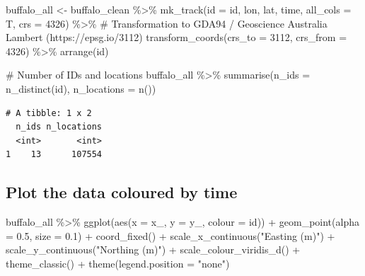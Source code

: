 \documentclass[
  letterpaper,
  DIV=11,
  numbers=noendperiod]{scrartcl}
\newenvironment{Shaded}{\begin{snugshade}}{\end{snugshade}}
\newcommand{\AttributeTok}[1]{\textcolor[rgb]{0.40,0.45,0.13}{#1}}
\newcommand{\CommentTok}[1]{\textcolor[rgb]{0.37,0.37,0.37}{#1}}
\newcommand{\DecValTok}[1]{\textcolor[rgb]{0.68,0.00,0.00}{#1}}
\newcommand{\FloatTok}[1]{\textcolor[rgb]{0.68,0.00,0.00}{#1}}
\newcommand{\FunctionTok}[1]{\textcolor[rgb]{0.28,0.35,0.67}{#1}}
\newcommand{\NormalTok}[1]{\textcolor[rgb]{0.00,0.23,0.31}{#1}}
\newcommand{\OtherTok}[1]{\textcolor[rgb]{0.00,0.23,0.31}{#1}}
\newcommand{\SpecialCharTok}[1]{\textcolor[rgb]{0.37,0.37,0.37}{#1}}
\newcommand{\StringTok}[1]{\textcolor[rgb]{0.13,0.47,0.30}{#1}}
\newcounter{none} %
\begin{document}
\begin{Shaded}
\begin{Highlighting}[]
\NormalTok{buffalo\_all }\OtherTok{\textless{}{-}}\NormalTok{ buffalo\_clean }\SpecialCharTok{\%\textgreater{}\%} \FunctionTok{mk\_track}\NormalTok{(}\AttributeTok{id =}\NormalTok{ id,}
\NormalTok{                                          lon,}
\NormalTok{                                          lat, }
\NormalTok{                                          time, }
                                          \AttributeTok{all\_cols =}\NormalTok{ T,}
                                          \AttributeTok{crs =} \DecValTok{4326}\NormalTok{) }\SpecialCharTok{\%\textgreater{}\%} 
  \CommentTok{\# Transformation to GDA94 / Geoscience Australia Lambert (https://epsg.io/3112)}
  \FunctionTok{transform\_coords}\NormalTok{(}\AttributeTok{crs\_to =} \DecValTok{3112}\NormalTok{, }\AttributeTok{crs\_from =} \DecValTok{4326}\NormalTok{) }\SpecialCharTok{\%\textgreater{}\%} \FunctionTok{arrange}\NormalTok{(id) }

\CommentTok{\# Number of IDs and locations}
\NormalTok{buffalo\_all }\SpecialCharTok{\%\textgreater{}\%}
  \FunctionTok{summarise}\NormalTok{(}\AttributeTok{n\_ids =} \FunctionTok{n\_distinct}\NormalTok{(id),}
            \AttributeTok{n\_locations =} \FunctionTok{n}\NormalTok{())}
\end{Highlighting}
\end{Shaded}

\begin{verbatim}
# A tibble: 1 x 2
  n_ids n_locations
  <int>       <int>
1    13      107554
\end{verbatim}

\subsection{Plot the data coloured by
time}\label{plot-the-data-coloured-by-time}

\begin{Shaded}
\begin{Highlighting}[]
\NormalTok{buffalo\_all }\SpecialCharTok{\%\textgreater{}\%}
  \FunctionTok{ggplot}\NormalTok{(}\FunctionTok{aes}\NormalTok{(}\AttributeTok{x =}\NormalTok{ x\_, }\AttributeTok{y =}\NormalTok{ y\_, }\AttributeTok{colour =}\NormalTok{ id)) }\SpecialCharTok{+}
  \FunctionTok{geom\_point}\NormalTok{(}\AttributeTok{alpha =} \FloatTok{0.5}\NormalTok{, }\AttributeTok{size =} \FloatTok{0.1}\NormalTok{) }\SpecialCharTok{+} 
  \FunctionTok{coord\_fixed}\NormalTok{() }\SpecialCharTok{+}
  \FunctionTok{scale\_x\_continuous}\NormalTok{(}\StringTok{"Easting (m)"}\NormalTok{) }\SpecialCharTok{+}
  \FunctionTok{scale\_y\_continuous}\NormalTok{(}\StringTok{"Northing (m)"}\NormalTok{) }\SpecialCharTok{+}
  \FunctionTok{scale\_colour\_viridis\_d}\NormalTok{() }\SpecialCharTok{+}
  \FunctionTok{theme\_classic}\NormalTok{() }\SpecialCharTok{+}
  \FunctionTok{theme}\NormalTok{(}\AttributeTok{legend.position =} \StringTok{"none"}\NormalTok{) }
\end{Highlighting}
\end{Shaded}
\end{document}
